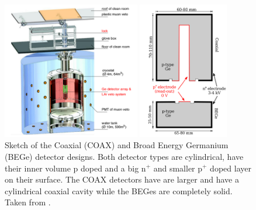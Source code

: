 \documentclass[encoding=utf8,british]{tumphthesis}
\begin{document}
\begin{figure}[t!]
	\centering
	\begin{minipage}{.45\textwidth}
		\centering
		\includegraphics[height=60mm]{./Bilder/GERDAsetupPhaseII.png}
		\caption{Sketch of the GERDA \PII\'s experimental setup. The germanium source and detectors are placed inside a liquid argon (LAr) tank which itself is surrounded by a water tank. Inside LAr tank a LAr veto system is installed and inside the water tank several photomultiplier are positioned for the Muon veto. Taken from \cite{collaboration_upgrade_2018}.}
		\label{fig:GERDASetupPII}
	\end{minipage}\hfill%
	\begin{minipage}{.45\textwidth}
		\centering
		\includegraphics[height=60mm]{./Bilder/DetectorDesign.png}
		\caption{Sketch of the Coaxial (COAX) and Broad Energy Germanium (BEGe) detector designs. Both detector types are cylindrical, have their inner volume p doped and a big n$^+$ and smaller p$^+$ doped layer on their surface. The COAX detectors have are larger and have a cylindrical coaxial cavity while the BEGes are completely solid. Taken from \cite{agostini_background_2014}.}
		\label{fig:DetcDes}
	\end{minipage}
\end{figure}
\end{document}
